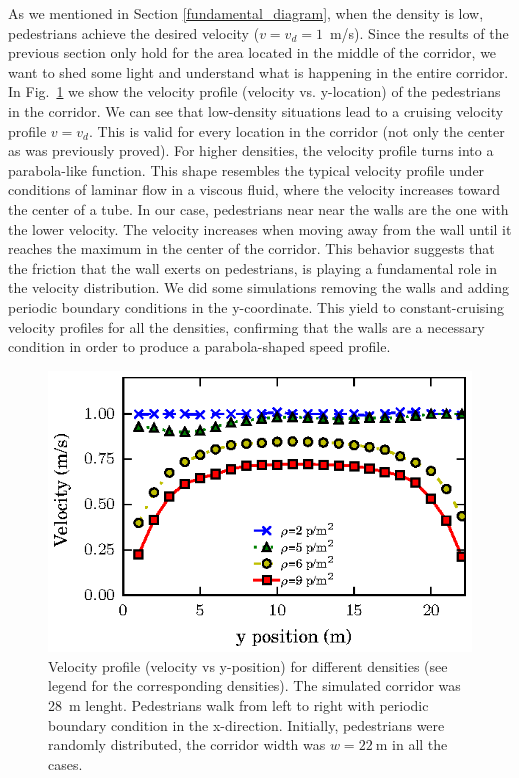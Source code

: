 As we mentioned in Section \ref{fundamental_diagram}, when the density is low, pedestrians achieve the desired velocity ($v=v_d=1$~m/s). Since the results of the previous section only hold for the area located in the middle of the corridor, we want to shed some light and understand what is happening in the entire corridor. In Fig.~\ref{speed-profile-w22} we show the velocity profile (velocity vs. y-location) of the pedestrians in the  corridor. We can see that low-density situations lead to a cruising velocity profile $v=v_d$. This is valid for every location in the corridor (not only the center as was previously proved). For higher densities, the velocity profile turns into a parabola-like function. This shape resembles the typical velocity profile under conditions of laminar flow in a viscous fluid, where the velocity increases toward the center of a tube. In our case, pedestrians near near the walls are the one with the lower velocity. The velocity increases when moving away from the wall until it reaches the maximum in the center of the corridor. This behavior suggests that the friction that the wall exerts on pedestrians, is playing a fundamental role in the velocity distribution. We did some simulations removing the walls and adding periodic boundary conditions in the y-coordinate. This yield to constant-cruising velocity profiles for all the densities, confirming that the walls are a necessary condition in order to produce a parabola-shaped speed profile.\\

\begin{figure}[htbp!]
\includegraphics[width=\columnwidth]
{plots/v(y)_width22_k24.eps}
\caption{\label{speed-profile-w22} Velocity profile (velocity vs y-position) for different densities (see legend for the corresponding densities). The simulated corridor was 28~m lenght. Pedestrians walk from left to right with periodic boundary condition in the x-direction. Initially, pedestrians were randomly distributed, the corridor width was $w = 22~$m in all the cases. }
\end{figure}

